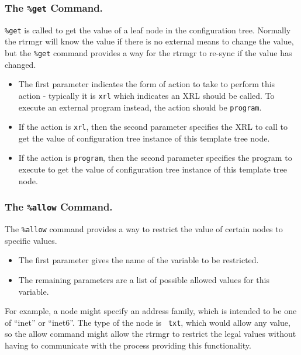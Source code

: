\documentclass[11pt]{article}
\begin{document}
\subsubsection{The {\tt \%get} Command.}
{\tt \%get} is called to get the value of a leaf node in the
configuration tree.  Normally the rtrmgr will know the value if there
is no external means to change the value, but the {\tt \%get} command
provides a way for the rtrmgr to re-sync if the value has changed.

\begin{itemize}
  \item The first parameter indicates the form of action to take to perform
   this action - typically it is {\tt xrl} which indicates an XRL should
   be called.
   To execute an external program instead, the action should be {\tt program}.

  \item If the action is {\tt xrl}, then the second parameter specifies the
   XRL to call to get the value of configuration tree instance of this template
   tree node.

  \item If the action is {\tt program}, then the second parameter specifies the
   program to execute to get the value of configuration tree instance of this
   template tree node.

\end{itemize}

\subsubsection{The {\tt \%allow} Command.}
The {\tt \%allow} command provides a way to restrict the value of
certain nodes to specific values.

\begin{itemize}

  \item The first parameter gives the name of the variable to be restricted.

  \item The remaining parameters are a list of possible allowed values for
this variable.
\end{itemize}

For example, a node might specify an address family, which is intended
to be one of ``inet'' or ``inet6''.  The type of the node is {\tt
txt}, which would allow any value, so the allow command might allow
the rtrmgr to restrict the legal values without having to
communicate with the process providing this functionality.
\end{document}
